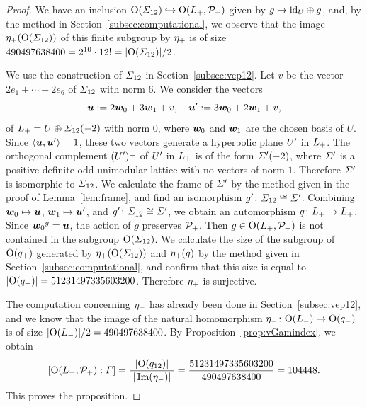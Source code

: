\documentclass{amsart} %
\begin{document}
\begin{proof}
We have an inclusion $\mathord{\mathrm{O}}(\varSigma_{12})\hookrightarrow \mathord{\mathrm{O}}(L_{+}, \mathord{\mathcal{P}}_{+})$
given by $g\mapsto \mathord{\mathrm{id}}_{U}\oplus g$,
and, by the method in Section~\ref{subsec:computational}, 
we observe that 
 the image ${\eta}_{+}(\mathord{\mathrm{O}}(\varSigma_{12}))$ of this finite subgroup %
by ${\eta}_{+}$ is 
of size $490497638400=2^{10}\cdot 12!=|\mathord{\mathrm{O}}(\varSigma_{12})|/2$.
 \par
 We use the construction of $\varSigma_{12}$ in Section~\ref{subsec:vep12}.
 Let $v$ be the vector $2e_1+\cdots +2e_6$ of $\varSigma_{12}$ with norm $6$.
 We consider the vectors
 \[
 \boldsymbol{u}:=2\boldsymbol{w}_0+ 3\boldsymbol{w}_1+v,
 \quad 
 \boldsymbol{u}^{\prime}:=3\boldsymbol{w}_0+ 2\boldsymbol{w}_1+v,
 \]
 of $L_{+}=U\oplus \varSigma_{12}(-2)$ with norm $0$,
 where $\boldsymbol{w}_0$ and $\boldsymbol{w}_1$ are the chosen basis of $U$. 
Since 
$\langle \boldsymbol{u}, \boldsymbol{u}^{\prime} \rangle=1$, these two vectors 
generate a hyperbolic plane $U^{\prime}$ in $L_{+}$.
 The orthogonal complement $(U^{\prime})^{\perp}$ of $U^{\prime}$ in $L_{+}$
 is of the form $\varSigma^{\prime}(-2)$,
where $\varSigma^{\prime}$ is a positive-definite odd unimodular lattice
with no vectors of norm $1$.
Therefore $\varSigma^{\prime}$ is isomorphic to $\varSigma_{12}$.
We calculate the frame of $\varSigma^{\prime}$ 
by the method given in the proof of Lemma~\ref{lem:frame},
and find an isomorphism $g^{\prime} \colon \varSigma_{12}\cong \varSigma^{\prime}$.
Combining $\boldsymbol{w}_0\mapsto \boldsymbol{u}$, $\boldsymbol{w}_1\mapsto \boldsymbol{u}^{\prime}$,
and $g^{\prime} \colon \varSigma_{12}\cong \varSigma^{\prime}$,
we obtain an automorphism $g\colon L_{+}\to L_{+}$.
Since ${\boldsymbol{w}_0}^g= \boldsymbol{u}$, 
the action of $g$ preserves $\mathord{\mathcal{P}}_{+}$.
Then $g\in \mathord{\mathrm{O}}(L_{+}, \mathord{\mathcal{P}}_{+})$
 is not contained in the subgroup $\mathord{\mathrm{O}}(\varSigma_{12})$.
We calculate the size of the subgroup of $\mathord{\mathrm{O}}(q_{+})$
generated by ${\eta}_{+}(\mathord{\mathrm{O}}(\varSigma_{12}))$ and ${\eta}_{+} (g)$
by the method given in Section~\ref{subsec:computational}, 
and confirm that 
this size is equal to $|\mathord{\mathrm{O}}(q_{+})|=51231497335603200$.
Therefore ${\eta}_{+}$ is surjective.
%
\par
The computation concerning ${\eta}_{-}$ has already been  done in 
Section~\ref{subsec:vep12},
and we know that the image of 
the natural homomorphism 
${\eta}_{-}\colon \mathord{\mathrm{O}}(L_{-}) \to \mathord{\mathrm{O}}(q_{-})$
is of size 
$|\mathord{\mathrm{O}}(L_{-})|/2=490497638400$.
By Proposition~\ref{prop:vGamindex},
we obtain 
\[
[\mathord{\mathrm{O}}(L_{+}, \mathord{\mathcal{P}}_{+}): \varGamma]
= \frac{ |\mathord{\mathrm{O}}(q_{12})|}{\; |\operatorname{Im}({\eta}_{-})|\;}
=
\frac{51231497335603200}{490497638400}
=
104448.
\]
This proves the proposition.
\end{proof}
\end{document}
